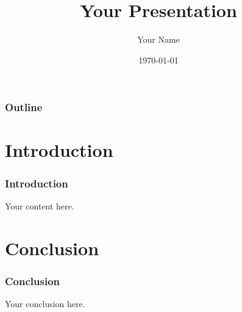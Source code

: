 \documentclass{beamer}
\title{Your Presentation}
\author{Your Name}
\date{\today}
\begin{document}
\frame{\titlepage}

\begin{frame}
\frametitle{Outline}
\tableofcontents
\end{frame}

\section{Introduction}
\begin{frame}
\frametitle{Introduction}
Your content here.
\end{frame}

\section{Conclusion}
\begin{frame}
\frametitle{Conclusion}
Your conclusion here.
\end{frame}
\end{document}
